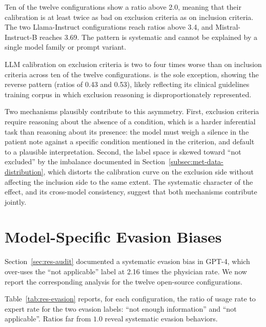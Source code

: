 Ten of the twelve configurations show a ratio above 2.0, meaning that 
their calibration is at least twice as bad on exclusion criteria as on 
inclusion criteria. The two Llama-Instruct configurations reach ratios 
above 3.4, and Mistral-Instruct-B reaches 3.69. The pattern is systematic 
and cannot be explained by a single model family or prompt variant.

\begin{finding}
    LLM calibration on exclusion criteria is two to four times worse 
    than on inclusion criteria across ten of the twelve configurations. 
     is the sole exception, showing the reverse pattern 
    (ratios of 0.43 and 0.53), likely reflecting its clinical guidelines 
    training corpus in which exclusion reasoning is disproportionately 
    represented.    
\end{finding}

Two mechanisms plausibly contribute to this asymmetry. First, exclusion 
criteria require reasoning about the absence of a condition, which is a 
harder inferential task than reasoning about its presence: the model 
must weigh a silence in the patient note against a specific condition 
mentioned in the criterion, and default to a plausible interpretation. 
Second, the label space is skewed toward ``not excluded'' by the 
imbalance documented in Section~\ref{subsec:met-data-distribution}, 
which distorts the calibration curve on the exclusion side without 
affecting the inclusion side to the same extent. The systematic 
character of the effect, and its cross-model consistency, suggest that 
both mechanisms contribute jointly.
\section{Model-Specific Evasion Biases}
\label{sec:res-evasion}

Section~\ref{sec:res-audit} documented a systematic evasion bias in 
GPT-4, which over-uses the ``not applicable'' label at 2.16 times the 
physician rate. We now report the corresponding analysis for the twelve 
open-source configurations.

Table~\ref{tab:res-evasion} reports, for each configuration, the ratio 
of usage rate to expert rate for the two evasion labels: 
``not enough information'' and ``not applicable''. Ratios far from $1.0$ 
reveal systematic evasion behaviors.

